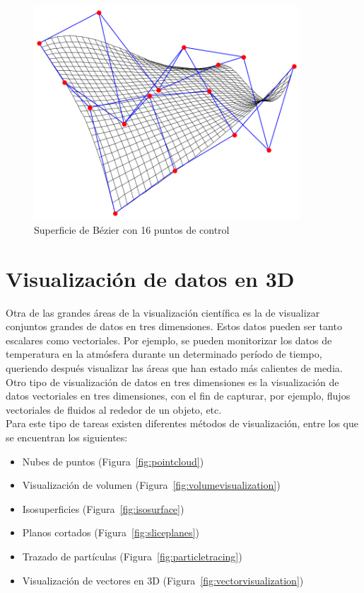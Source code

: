 \begin{figure}[t]
	\centering	
	\includegraphics[height=8cm]{figures/beziersurface.png}
	\caption{Superficie de Bézier con 16 puntos de control}
	\label{fig:beziersurface}
\end{figure}

\section{Visualización de datos en 3D}
\label{ref:cloud}

Otra de las grandes áreas de la visualización científica es la de visualizar
conjuntos grandes de datos en tres dimensiones. Estos datos pueden ser tanto
escalares como vectoriales. Por ejemplo, se pueden monitorizar los datos de
temperatura en la atmósfera durante un determinado período de tiempo, queriendo
después visualizar las áreas que han estado más calientes de media. \\

Otro tipo de visualización de datos en tres dimensiones es la visualización de
datos vectoriales en tres dimensiones, con el fin de capturar, por ejemplo,
flujos vectoriales de fluidos al rededor de un objeto, etc.\\

Para este tipo de tareas existen diferentes métodos de visualización, entre los
que se encuentran los siguientes:

\begin{itemize}
	\item Nubes de puntos (Figura~\ref{fig:pointcloud})
	\item Visualización de volumen (Figura~\ref{fig:volumevisualization})
	\item Isosuperficies (Figura~\ref{fig:isosurface})
	\item Planos cortados (Figura~\ref{fig:sliceplanes})
	\item Trazado de partículas (Figura~\ref{fig:particletracing})
	\item Visualización de vectores en 3D  (Figura~\ref{fig:vectorvisualization})
\end{itemize}

